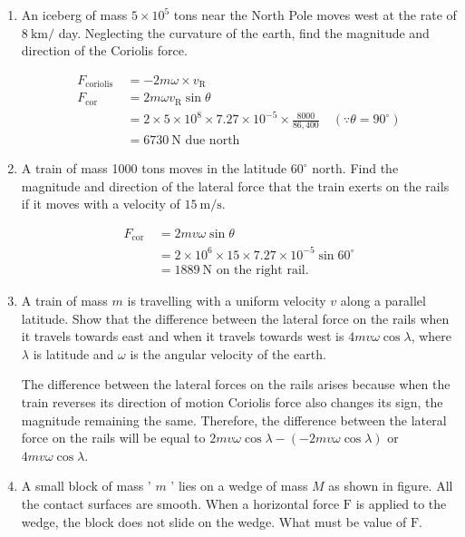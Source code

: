\begin{enumerate} [label=\color{ocre}\textbf{\arabic*.}]
\item An iceberg of mass $5 \times 10^{5}$ tons near the North Pole moves west at the rate of $8 \mathrm{~km} /$ day. Neglecting the curvature of the earth, find the magnitude and direction of the Coriolis force.
\begin{answer}
	\begin{align*}
F_{\text {coriolis }}&=-2 m \omega \times v_{\mathrm{R}} \\
F_{\text {cor }}&=2 m \omega v_{\mathrm{R}} \sin \theta\\&=2 \times 5 \times 10^{8} \times 7.27 \times 10^{-5} \times \frac{8000}{86,400} \quad\left(\because \theta=90^{\circ}\right) \\
&=6730 \mathrm{~N} \text { due north }
	\end{align*}
\end{answer}
\item A train of mass 1000 tons moves in the latitude $60^{\circ}$ north. Find the magnitude and direction of the lateral force that the train exerts on the rails if it moves with a velocity of $15 \mathrm{~m} / \mathrm{s}$.
\begin{answer}
	\begin{align*}
	F_{\text {cor }} &=2 m v \omega \sin \theta \\
	&=2 \times 10^{6} \times 15 \times 7.27 \times 10^{-5} \sin 60^{\circ} \\
	&=1889 \mathrm{~N} \text { on the right rail. }
	\end{align*}
\end{answer}
\item A train of mass $m$ is travelling with a uniform velocity $v$ along a parallel latitude. Show that the difference between the lateral force on the rails when it travels towards east and when it travels towards west is $4 m v \omega \cos \lambda$, where $\lambda$ is latitude and $\omega$ is the angular velocity of the earth.
\begin{answer}
	The difference between the lateral forces on the rails arises because when the train reverses its direction of motion Coriolis force also changes its sign, the magnitude remaining the same. Therefore, the difference between the lateral force on the rails will be equal to $2 m v \omega \cos \lambda-(-2 m v \omega \cos \lambda)$ or $4 m v \omega \cos \lambda$.
\end{answer}
\item  A small block of mass ' $m$ ' lies on a wedge of mass $M$ as shown in figure. All the contact surfaces are smooth. When a horizontal force $\mathrm{F}$ is applied to the wedge, the block does not slide on the wedge. What must be value of $\mathrm{F}$.

\end{enumerate}
